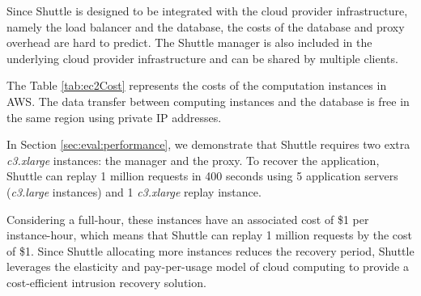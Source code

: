 


Since Shuttle is designed to be integrated with the cloud provider infrastructure, namely the load balancer and the database, the costs of the database and proxy overhead are hard to predict. The Shuttle manager is also included in the underlying cloud provider infrastructure and can be shared by multiple clients. 

The Table \ref{tab:ec2Cost} represents the costs of the computation instances in \ac{AWS}. The data transfer between computing instances and the database is free in the same region using private \ac{IP} addresses.

In Section \ref{sec:eval:performance}, we demonstrate that Shuttle requires two extra \emph{c3.xlarge} instances: the manager and the proxy. To recover the application, Shuttle can replay 1 million requests in 400 seconds using 5 application servers (\emph{c3.large} instances) and 1 \emph{c3.xlarge} replay instance.

Considering a full-hour, these instances have an associated cost of \$1 per instance-hour, which means that Shuttle can replay 1 million requests by the cost of \$1. Since Shuttle allocating more instances reduces the recovery period, Shuttle leverages the elasticity and pay-per-usage model of cloud computing to provide a cost-efficient intrusion recovery solution. 

